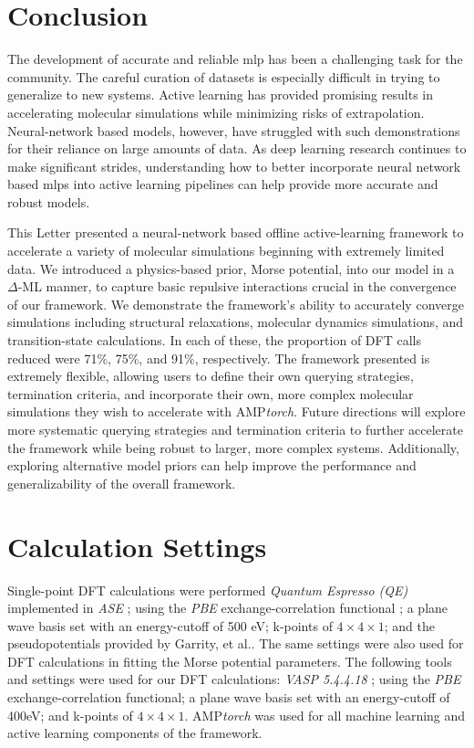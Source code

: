 \documentclass[%
 reprint,
 amsmath,amssymb,
 aps,
]{revtex4-2}
\begin{document}
\section{Conclusion}

The development of accurate and reliable \gls{mlp} has been a challenging task for the community. The careful curation of datasets is especially difficult in trying to generalize to new systems. Active learning has provided promising results in accelerating molecular simulations while minimizing risks of extrapolation. Neural-network based models, however, have struggled with such demonstrations for their reliance on large amounts of data. As deep learning research continues to make significant strides, understanding how to better incorporate neural network based \gls{mlp}s into active learning pipelines can help provide more accurate and robust models.

This Letter presented a neural-network based offline active-learning framework to accelerate a variety of molecular simulations beginning with extremely limited data. We introduced a physics-based prior, Morse potential, into our model in a $\Delta$-ML manner, to capture basic repulsive interactions crucial in the convergence of our framework. We demonstrate the framework's ability to accurately converge simulations including structural relaxations, molecular dynamics simulations, and transition-state calculations. In each of these, the proportion of DFT calls reduced were 71\%, 75\%, and 91\%, respectively. The framework presented is extremely flexible, allowing users to define their own querying strategies, termination criteria, and incorporate their own, more complex molecular simulations they wish to accelerate with AMP\textit{torch}. Future directions will explore more systematic querying strategies and termination criteria to further accelerate the framework while being robust to larger, more complex systems. Additionally, exploring alternative model priors can help improve the performance and generalizability of the overall framework. 

\section{Calculation Settings}

Single-point \gls{DFT} calculations were performed \textit{Quantum Espresso (QE)\cite{Giannozzi2009}} implemented in \textit{ASE} \cite{HjorthLarsen2017}; using the \textit{PBE} exchange-correlation functional \cite{Perdew1996}; a plane wave basis set with an energy-cutoff of 500 eV; k-points of $4 \times 4 \times 1$; and the pseudopotentials provided by Garrity, et al.\cite{Garrity2014}. The same settings were also used for \gls{DFT} calculations in fitting the Morse potential parameters. The following tools and settings were used for our DFT calculations: \textit{\gls{VASP} 5.4.4.18} \cite{Kresse1993, Kresse1996}; using the \textit{PBE} exchange-correlation functional; a plane wave basis set with an energy-cutoff of 400eV; and k-points of $4\times4\times1$. AMP\textit{torch} \cite{amptorch} was used for all machine learning and active learning components of the framework.
\end{document}
